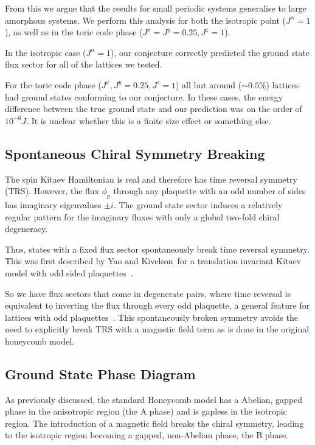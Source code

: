From this we argue that the results for small periodic systems generalise to large amorphous systems. We perform this analysis for both the isotropic point (\(J^\alpha = 1\)), as well as in the toric code phase (\(J^x = J^y = 0.25, J^z = 1\)).

In the isotropic case (\(J^\alpha = 1\)), our conjecture correctly predicted the ground state flux sector for all of the lattices we tested.

For the toric code phase (\(J^x, J^y = 0.25, J^z = 1\)) all but around (\(\sim 0.5 \%\)) lattices had ground states conforming to our conjecture. In these cases, the energy difference between the true ground state and our prediction was on the order of \(10^{-6} J\). It is unclear whether this is a finite size effect or something else.

\hypertarget{spontaneous-chiral-symmetry-breaking}{%
\subsection{Spontaneous Chiral Symmetry Breaking}\label{spontaneous-chiral-symmetry-breaking}}

The spin Kitaev Hamiltonian is real and therefore has time reversal symmetry (TRS). However, the flux \(\phi_p\) through any plaquette with an odd number of sides has imaginary eigenvalues \(\pm i\). The ground state sector induces a relatively regular pattern for the imaginary fluxes with only a global two-fold chiral degeneracy.

Thus, states with a fixed flux sector spontaneously break time reversal symmetry. This was first described by Yao and Kivelson~for a translation invariant Kitaev model with odd sided plaquettes~\autocite{Yao2011}.

So we have flux sectors that come in degenerate pairs, where time reversal is equivalent to inverting the flux through every odd plaquette, a general feature for lattices with odd plaquettes~\autocite{yaoExactChiralSpin2007,Peri2020}. This spontaneously broken symmetry avoids the need to explicitly break TRS with a magnetic field term as is done in the original honeycomb model.

\hypertarget{ground-state-phase-diagram}{%
\subsection{Ground State Phase Diagram}\label{ground-state-phase-diagram}}

As previously discussed, the standard Honeycomb model has a Abelian, gapped phase in the anisotropic region (the A phase) and is gapless in the isotropic region. The introduction of a magnetic field breaks the chiral symmetry, leading to the isotropic region becoming a gapped, non-Abelian phase, the B phase.

